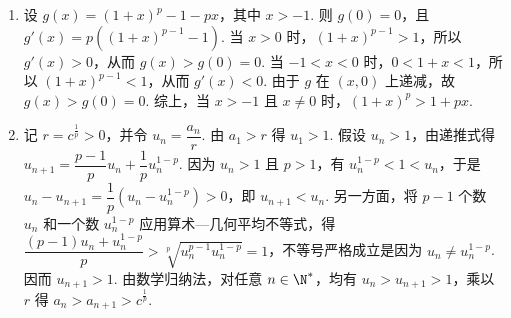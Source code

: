 \begin{solution}
\begin{enumerate}
\item 设 \(g(x)=(1+x)^{p}-1-px\)，其中 \(x>-1\). 则 \(g(0)=0\)，且 \(g'(x)=p\left((1+x)^{p-1}-1\right)\). 当 \(x>0\) 时，\((1+x)^{p-1}>1\)，所以 \(g'(x)>0\)，从而 \(g(x)>g(0)=0\). 当 \(-1<x<0\) 时，\(0<1+x<1\)，所以 \((1+x)^{p-1}<1\)，从而 \(g'(x)<0\). 由于 \(g\) 在 \((x,0)\) 上递减，故 \(g(x)>g(0)=0\). 综上，当 \(x>-1\) 且 \(x\neq0\) 时，\((1+x)^{p}>1+px\).
\item 记 \(r=c^{\frac{1}{p}}>0\)，并令 \(u_n=\dfrac{a_n}{r}\). 由 \(a_1>r\) 得 \(u_1>1\). 假设 \(u_n>1\)，由递推式得 \(u_{n+1}=\dfrac{p-1}{p}u_n+\dfrac{1}{p}u_n^{1-p}\). 因为 \(u_n>1\) 且 \(p>1\)，有 \(u_n^{1-p}<1<u_n\)，于是 \(u_n-u_{n+1}=\dfrac{1}{p}\left(u_n-u_n^{1-p}\right)>0\)，即 \(u_{n+1}<u_n\). 另一方面，将 \(p-1\) 个数 \(u_n\) 和一个数 \(u_n^{1-p}\) 应用算术—几何平均不等式，得 \(\dfrac{(p-1)u_n+u_n^{1-p}}{p}>\sqrt[p]{u_n^{p-1}u_n^{1-p}}=1\)，不等号严格成立是因为 \(u_n\neq u_n^{1-p}\). 因而 \(u_{n+1}>1\). 由数学归纳法，对任意 \(n\in\N^*\)，均有 \(u_n>u_{n+1}>1\)，乘以 \(r\) 得 \(a_n>a_{n+1}>c^{\frac{1}{p}}\).
\end{enumerate}
\end{solution}
